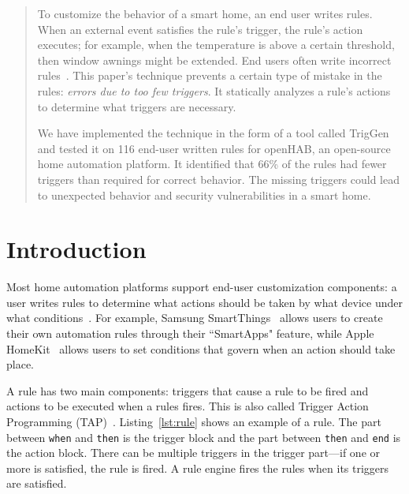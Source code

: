 \documentclass{sig-alternate-05-2015}
\begin{document}
\maketitle
\begin{abstract}
To customize the behavior of a smart home, an end user writes rules.
When an external event satisfies the rule's trigger, the rule's action executes; for example, when
the temperature is above a certain threshold, then window awnings might be extended.
End users often write incorrect rules~\cite{Huang}.
This paper's technique prevents a certain type of mistake in the rules:  
\textit{errors due to too few triggers}.
It statically analyzes a rule's actions to determine what triggers are necessary. 

We have implemented the technique in the form of a tool called TrigGen and tested it on 116 end-user written
rules for openHAB, an open-source home automation platform.
It identified that 66\% of the rules had fewer triggers than required
for correct behavior.
The missing triggers could lead to unexpected behavior
and security vulnerabilities in a smart home.

\end{abstract}

\printccsdesc



\section{Introduction}
Most home automation platforms support end-user customization components: a
user writes rules to determine what actions should be taken by what device
under what conditions~\cite{Newmannowwere}. For example, Samsung
SmartThings~\cite{samsung} allows users to create their own automation
rules through their ``SmartApps" feature, while Apple
HomeKit~\cite{homekit} allows users to set conditions that
govern when an action should take place.

A rule has two main components:
triggers that cause a rule to be fired and actions to be executed when a
rules fires. This is also called Trigger Action Programming
(TAP)~\cite{practical-tap}. Listing~\ref{lst:rule} shows an example of a rule. The part between
\texttt{when} and \texttt{then} is the trigger block and the part between
\texttt{then} and \texttt{end} is the action block. There can be multiple
triggers in the trigger part---if one or more is satisfied, the rule is
fired.
A rule engine fires the rules when its triggers are satisfied.
\end{document}
